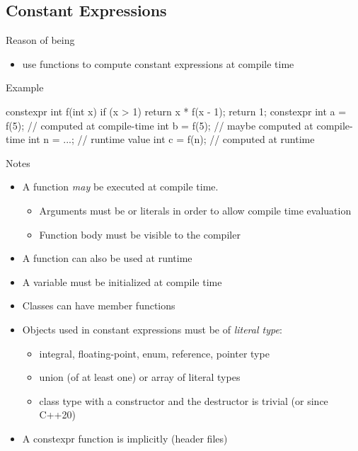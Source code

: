 \subsection[cstexpr]{Constant Expressions}

\begin{frame}[fragile]
  \begin{block}{Reason of being}
    \begin{itemize}
    \item use functions to compute constant expressions at compile time
    \end{itemize}
  \end{block}
  \pause
  \begin{exampleblock}{Example}
    \begin{cppcode*}{}
      constexpr int f(int x) {
        if (x > 1) return x * f(x - 1);
        return 1;
      }
      constexpr int a = f(5); // computed at compile-time
      int b = f(5); // maybe computed at compile-time
      int n = ...;  // runtime value
      int c = f(n); // computed at runtime
    \end{cppcode*}
  \end{exampleblock}
\end{frame}

\begin{frame}[fragile]
  \begin{block}{Notes}
    \begin{itemize}
    \item A  function \emph{may} be executed at compile time.
    \begin{itemize}
      \item Arguments must be  or literals in order to allow compile time evaluation
      \item Function body must be visible to the compiler
    \end{itemize}
    \item A  function can also be used at runtime
    \item A  variable must be initialized at compile time
    \item Classes can have  member functions
    \item Objects used in constant expressions must be of \emph{literal type}:
      \begin{itemize}
      \item integral, floating-point, enum, reference, pointer type
      \item union (of at least one) or array of literal types
      \item class type with a  constructor and
            the destructor is trivial (or  since C++20)
      \end{itemize}
    \item A constexpr function is implicitly  (header files)
    \end{itemize}
  \end{block}
\end{frame}


